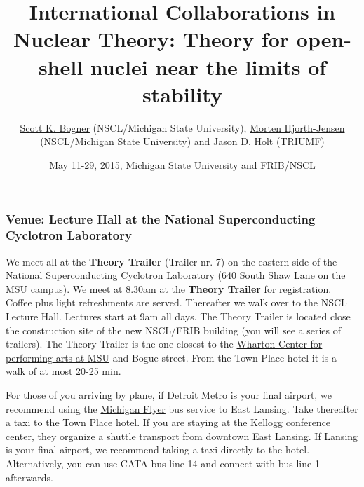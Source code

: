 \documentclass{beamer}
\begin{document}







\title{International Collaborations in Nuclear Theory: Theory for open-shell nuclei near the limits of stability}


\author{\href{{http://nscl.msu.edu/directory/bogner.html}}{Scott K. Bogner} (NSCL/Michigan State University), \href{{https://www.pa.msu.edu/profile/hjensen}}{Morten Hjorth-Jensen} (NSCL/Michigan State University) and \href{{http://www.triumf.ca/jason-d-holt}}{Jason D. Holt} (TRIUMF)\inst{}}
\institute{}


\date{May 11-29, 2015, Michigan State University and FRIB/NSCL
}

\begin{frame}
\titlepage
\end{frame}

\begin{frame}
\frametitle{Venue: Lecture Hall at the National Superconducting Cyclotron Laboratory}

\begin{block}{}
We meet all at the \textbf{Theory Trailer} (Trailer nr. 7) on the eastern side of the \href{{http://www.nscl.msu.edu/}}{National Superconducting Cyclotron
Laboratory} (640 South Shaw Lane on the MSU campus).  
We meet at 8.30am at the \textbf{Theory Trailer} for registration. Coffee plus light refreshments are served. Thereafter we walk over to the NSCL Lecture Hall. Lectures start at 9am all days.
The Theory Trailer is located close the construction site of the new NSCL/FRIB building (you will see a series of trailers). The Theory Trailer is the one closest to the \href{{http://www.whartoncenter.com}}{Wharton Center for performing arts at MSU} and Bogue street. 
From the Town Place hotel it is a walk of at \href{{https://www.google.com/maps/dir/2855+Hannah+Blvd,+East+Lansing,+MI+48823/640+South+Shaw+Lane,+East+Lansing,+MI/@42.7219308,-84.4747951,15z/data=!3m1!4b1!4m14!4m13!1m5!1m1!1s0x8822c2bce3547475:0xd5a97d9b6a59e537!2m2!1d-84.456337!2d42.718323!1m5!1m1!1s0x8822c2841754be71:0xb0ff5dca5dac1c71!2m2!1d-84.4738287!2d42.7247813!3e2}}{most 20-25 min}.

For those of you arriving by plane, if Detroit Metro is your final airport, we recommend using the \href{{http://www.michiganflyer.com}}{Michigan Flyer} bus service to East Lansing. Take thereafter a taxi to the Town Place hotel. If you are staying at the Kellogg conference center, they organize a shuttle transport from downtown East Lansing. If Lansing is your final airport, we recommend taking a taxi directly to the hotel. Alternatively, you can use CATA bus line 14 and connect with bus line 1 afterwards. 
\end{block}
\end{frame}
\end{document}
